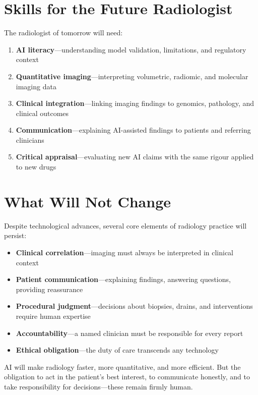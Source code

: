 \section{Skills for the Future Radiologist}
The radiologist of tomorrow will need:
\begin{enumerate}
    \item \textbf{AI literacy}---understanding model validation, limitations, and regulatory context
    \item \textbf{Quantitative imaging}---interpreting volumetric, radiomic, and molecular imaging data
    \item \textbf{Clinical integration}---linking imaging findings to genomics, pathology, and clinical outcomes
    \item \textbf{Communication}---explaining AI-assisted findings to patients and referring clinicians
    \item \textbf{Critical appraisal}---evaluating new AI claims with the same rigour applied to new drugs
\end{enumerate}

\section{What Will Not Change}
Despite technological advances, several core elements of radiology practice will persist:
\begin{itemize}
    \item \textbf{Clinical correlation}---imaging must always be interpreted in clinical context
    \item \textbf{Patient communication}---explaining findings, answering questions, providing reassurance
    \item \textbf{Procedural judgment}---decisions about biopsies, drains, and interventions require human expertise
    \item \textbf{Accountability}---a named clinician must be responsible for every report
    \item \textbf{Ethical obligation}---the duty of care transcends any technology
\end{itemize}

\begin{pearlbox}
AI will make radiology faster, more quantitative, and more efficient. But the obligation to act in the patient's best interest, to communicate honestly, and to take responsibility for decisions---these remain firmly human.
\end{pearlbox}

